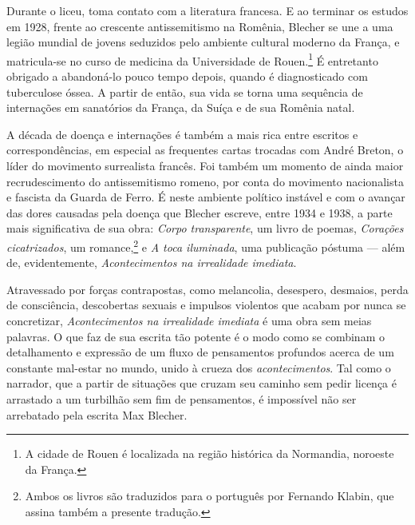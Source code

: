 Durante o liceu, toma contato com a literatura francesa. E ao terminar os estudos em 1928, frente ao crescente antissemitismo na Romênia, Blecher se une a uma legião mundial de jovens seduzidos pelo ambiente cultural moderno da França, e matricula-se no curso de medicina da Universidade de Rouen.\footnote{A cidade de Rouen é localizada na região histórica da Normandia, noroeste da França.} É entretanto obrigado a abandoná-lo pouco tempo depois, quando é diagnosticado com tuberculose óssea. A partir de então, sua vida se torna uma sequência de internações em sanatórios da França, da Suíça e de sua Romênia natal.
	
A década de doença e internações é também a mais rica entre escritos e correspondências, em especial as frequentes cartas trocadas com André Breton, o líder do movimento surrealista francês. Foi também um momento de ainda maior recrudescimento do antissemitismo romeno, por conta do movimento nacionalista e fascista da Guarda de Ferro. É neste ambiente político instável e com o avançar das dores causadas pela doença que Blecher escreve, entre 1934 e 1938, a parte mais significativa de sua obra: \textit{Corpo transparente}, um livro de poemas, \textit{Corações cicatrizados}, um romance,\footnote{Ambos os livros são traduzidos para o português por Fernando Klabin, que assina também a presente tradução.} e \textit{A toca iluminada}, uma publicação póstuma --- além de, evidentemente, \textit{Acontecimentos na irrealidade imediata}.

Atravessado por forças contrapostas, como melancolia, desespero, desmaios, perda de consciência, descobertas sexuais e impulsos violentos que acabam por nunca se concretizar, \textit{Acontecimentos na irrealidade imediata} é uma obra sem meias palavras. O que faz de sua escrita tão potente é o modo como se combinam o detalhamento e expressão de um fluxo de pensamentos profundos acerca de um constante mal-estar no mundo, unido à crueza dos \textit{acontecimentos}. Tal como o narrador, que a partir de situações que cruzam seu caminho sem pedir licença é arrastado a um turbilhão sem fim de pensamentos, é impossível não ser arrebatado pela escrita Max Blecher.